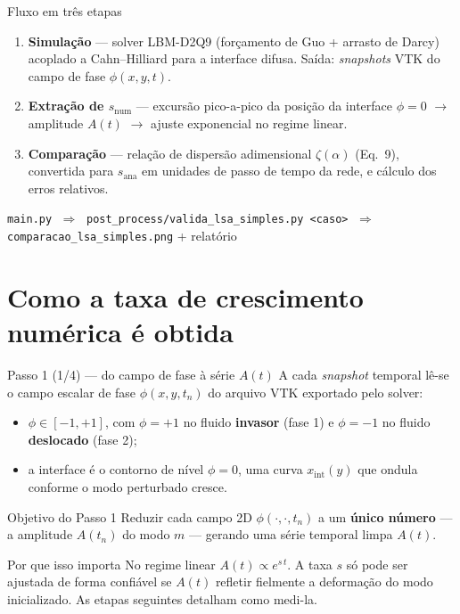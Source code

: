 \documentclass[aspectratio=169,11pt]{beamer}
\newcommand{\snum}{s_{\mathrm{num}}}
\newcommand{\sana}{s_{\mathrm{ana}}}
\begin{document}
\begin{frame}{Fluxo em três etapas}
  \begin{enumerate}
    \item[\textbf{1}] \textbf{Simulação} — solver LBM-D2Q9 (forçamento de Guo +
          arrasto de Darcy) acoplado a Cahn--Hilliard para a interface difusa.
          Saída: \emph{snapshots} VTK do campo de fase $\phi(x,y,t)$.
    \item[\textbf{2}] \textbf{Extração de $\snum$} — excursão pico-a-pico da
          posição da interface $\phi=0$ $\rightarrow$ amplitude $A(t)$
          $\rightarrow$ ajuste exponencial no regime linear.
    \item[\textbf{3}] \textbf{Comparação} — relação de dispersão adimensional
          $\zeta(\alpha)$ (Eq.~9), convertida para $\sana$ em unidades de
          passo de tempo da rede, e cálculo dos erros relativos.
  \end{enumerate}
  \vspace{0.6em}
  \begin{center}
    \footnotesize
    \texttt{main.py} $\;\Rightarrow\;$
    \texttt{post\_process/valida\_lsa\_simples.py <caso>} $\;\Rightarrow\;$
    \texttt{comparacao\_lsa\_simples.png} + relatório
  \end{center}
\end{frame}

\section{Como a taxa de crescimento numérica é obtida}
\begin{frame}{Passo 1 (1/4) — do campo de fase à série $A(t)$}
  A cada \emph{snapshot} temporal lê-se o campo escalar de fase
  $\phi(x,y,t_n)$ do arquivo VTK exportado pelo solver:
  \begin{itemize}
    \item $\phi\in[-1,+1]$, com $\phi=+1$ no fluido \textbf{invasor} (fase 1) e
          $\phi=-1$ no fluido \textbf{deslocado} (fase 2);
    \item a interface é o contorno de nível $\phi=0$, uma curva $x_{\mathrm{int}}(y)$
          que ondula conforme o modo perturbado cresce.
  \end{itemize}
  \begin{block}{Objetivo do Passo 1}
    Reduzir cada campo 2D $\phi(\cdot,\cdot,t_n)$ a um \textbf{único número} —
    a amplitude $A(t_n)$ do modo $m$ — gerando uma série temporal limpa $A(t)$.
  \end{block}
  \begin{alertblock}{Por que isso importa}
    No regime linear $A(t)\propto e^{s\,t}$. A taxa $s$ só pode ser ajustada de
    forma confiável se $A(t)$ refletir fielmente a deformação do modo
    inicializado. As etapas seguintes detalham como medi-la.
  \end{alertblock}
\end{frame}
\end{document}
